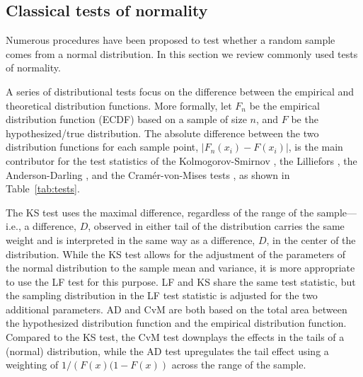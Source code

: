 \documentclass[12pt]{article}\usepackage[]{graphicx}\usepackage[]{color}
\newcommand{\alnote}[1]{\todo[inline,color=green!40]{#1}}
\newcommand{\hhnote}[1]{\todo[inline,color=magenta!40]{#1}}
\begin{document}


\subsection{Classical tests of normality}
Numerous procedures have been proposed to test whether a random sample comes from a normal distribution. In this section we review commonly used tests of normality. 

A series of distributional tests focus on the difference between the empirical and theoretical distribution functions. More formally, let $F_n$ be the empirical distribution function (ECDF) based on a sample of size $n$, and $F$ be the hypothesized/true distribution. The absolute difference between the two distribution functions for each sample point, $\left| F_n(x_i) - F(x_i) \right|$, is the main contributor for the test statistics of the Kolmogorov-Smirnov \cite[KS-test,][]{kolmogorov:1933, smirnov:1948}, the Lilliefors \cite[LF-test, ][]{lilliefors}, the Anderson-Darling \citep[AD-test,][]{adtest:1954}, and the Cram\'{e}r-von-Mises tests \citep[CvM-test,][]{cramer:1928, mises:1928}, as shown in Table~\ref{tab:tests}.

The KS test uses the maximal  difference, 
regardless of the range of the sample---i.e., a difference, $D$, observed in either tail of the distribution carries the same weight and is interpreted in the same way as a difference, $D$, in the center of the distribution. While the KS test allows for the adjustment of the parameters of the normal distribution to the sample mean and variance, it is more appropriate to use the LF test for this purpose. LF and KS share the same test statistic, but the sampling distribution in the LF test statistic is adjusted for the two additional parameters.  AD and CvM  are both based on the total area between the hypothesized distribution function and the empirical distribution function. Compared to the KS  test,  the CvM test downplays the effects in the tails of a (normal) distribution, while the AD test upregulates the tail effect using a weighting of $1/\left(F(x)(1 - F(x)\right)$ across the range of the sample. 
\end{document}
